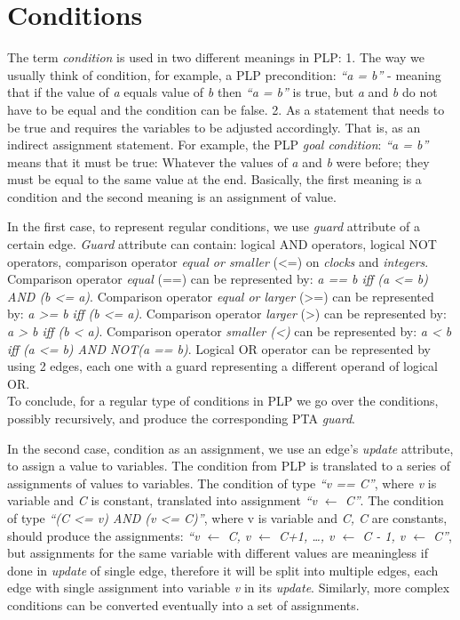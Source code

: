 \section{Conditions \label{plp_to_pta_conditions}}
The term \textit{condition} is used in two different meanings in PLP: 1. The way we usually think of condition, for example, a PLP precondition: \textit{“a = b”} - meaning that if the value of \textit{a} equals value of \textit{b} then \textit{“a = b”} is true, but \textit{a} and \textit{b} do not have to be equal and the condition can be false. 2. As a statement that needs to be true and requires the variables to be adjusted accordingly. That is, as an indirect assignment statement. For example, the PLP \textit{\textit{goal condition}}: \textit{“a = b”} means that it must be true: Whatever the values of \textit{a} and \textit{b} were before; they must be equal to the same value at the end. Basically, the first meaning is a condition and the second meaning is an assignment of value. 
\par In the first case, to represent regular conditions, we use \textit{guard} attribute of a certain edge. \textit{Guard} attribute can contain: logical AND operators, logical NOT operators, comparison operator \textit{equal or smaller} (<=) on \textit{\textit{clocks}} and \textit{integers}. Comparison operator \textit{equal} (==) can be represented by: \textit{a == b iff (a <= b) AND (b <= a)}. Comparison operator \textit{equal or larger} (>=) can be represented by: \textit{a >= b iff (b <= a)}. Comparison operator \textit{larger} (>) can be represented by: \textit{a > b iff (b < a)}. Comparison operator \textit{smaller (<)} can be represented by: \textit{a < b iff (a <= b) AND NOT(a == b)}. Logical OR operator can be represented by using 2 edges, each one with a guard representing a different operand of logical OR.\\
To conclude, for a regular type of conditions in PLP we go over the conditions, possibly recursively, and produce the corresponding PTA \textit{guard}.
\par In the second case, condition as an assignment, we use an edge’s \textit{update} attribute, to assign a value to variables. The condition from PLP is translated to a series of assignments of values to variables. The condition of type \textit{“v == C”}, where \textit{v} is variable and \textit{C} is constant, translated into assignment \textit{“v $\leftarrow$ C”}. The condition of type \textit{“(C <= v) AND (v <= C)”}, where v is variable and \textit{C, C} are constants, should produce the assignments: \textit{“v $\leftarrow$ C, v $\leftarrow$ C+1, …, v $\leftarrow$ C - 1, v $\leftarrow$ C”}, but assignments for the same variable with different values are meaningless if done in \textit{update} of single edge, therefore it will be split into multiple edges, each edge with single assignment into variable \textit{v} in its \textit{update}. Similarly, more complex conditions can be converted eventually into a set of assignments. \\
